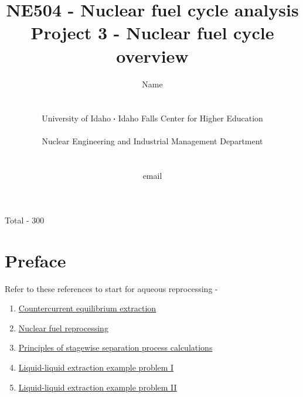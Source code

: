 \documentclass[11pt,a4paper]{article}
\newcommand*\sq{\mathbin{\vcenter{\hbox{\rule{.3ex}{.3ex}}}}} %
\begin{document}
\begin{titlepage}
    \title{
        NE504 - Nuclear fuel cycle analysis\\
        Project 3 - Nuclear fuel cycle overview\\
    }
    \author{
        Name
        \\ \\ \\
        University of Idaho $\sq$ Idaho Falls Center for Higher Education
        \\ \\
        Nuclear Engineering and Industrial Management Department
        \\ \\ \\
        email 
    }
\clearpage %
\maketitle
\vspace*{\fill}
\begin{flushright}{
        Total - 300 
}
\end{flushright}
\thispagestyle{empty} %
\end{titlepage}

\printnoidxglossary

\newpage

\section*{Preface}

\noindent Refer to these references to start for aqueous reprocessing -
\begin{enumerate}[leftmargin=*,topsep=0pt]
    \item\href{../homework-resources/countercurrent-equilibrium-extraction.pdf}{Countercurrent equilibrium extraction}
    \item\href{../homework-resources/nuclear-fuel-reprocessing.pdf}{Nuclear fuel reprocessing}
    \item\href{../homework-resources/principles-stagewise-separation-process-calculations.pdf}{Principles of stagewise separation process calculations}
    \item\href{https://youtu.be/HGwHLaPhw30}{Liquid-liquid extraction example problem I}
    \item\href{https://youtu.be/vK8XGYwnZv4}{Liquid-liquid extraction example problem II}
\end{enumerate}
\vspace{\baselineskip}
\end{document}
